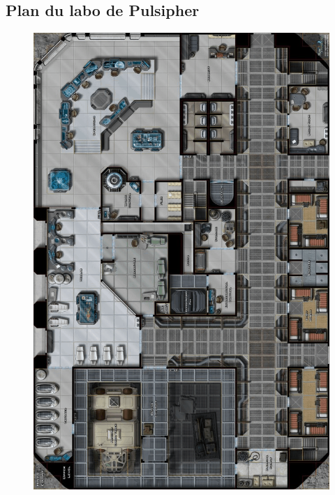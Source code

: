 

\onecolumn
\subsection{Plan du labo de Pulsipher}\label{sec:plan-labo-pulsipher}
\begin{figure}[!h]
    \centering
    \includegraphics[height=0.94\textheight]{_img/dos-au-muur/labo-pulsipher-map.png}
\end{figure}

\twocolumn